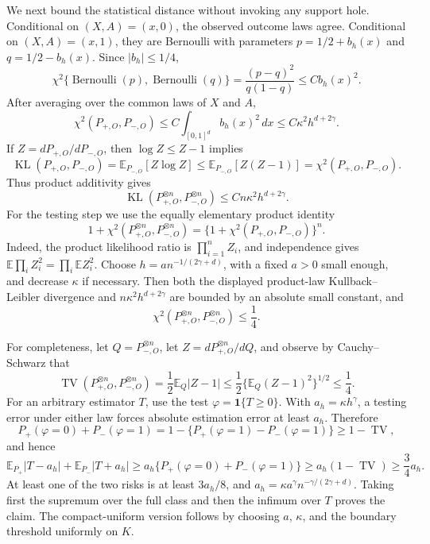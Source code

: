 We next bound the statistical distance without invoking any support hole.  Conditional on \((X,A)=(x,0)\), the observed outcome laws agree.  Conditional on \((X,A)=(x,1)\), they are Bernoulli with parameters \(p=1/2+b_h(x)\) and \(q=1/2-b_h(x)\).  Since \(|b_h|\leq1/4\),
\[
 \chi^2\{\operatorname{Bernoulli}(p),\operatorname{Bernoulli}(q)\}
 =\frac{(p-q)^2}{q(1-q)}\leq Cb_h(x)^2.
\]
After averaging over the common laws of \(X\) and \(A\),
\[
 \chi^2(P_{+,O},P_{-,O})\leq C\int_{[0,1]^d}b_h(x)^2\,dx
 \leq C\kappa^2h^{d+2\gamma}.
\]
If \(Z=dP_{+,O}/dP_{-,O}\), then \(\log Z\leq Z-1\) implies
\[
 \operatorname{KL}(P_{+,O},P_{-,O})
 =\mathbb E_{P_{-,O}}[Z\log Z]
 \leq\mathbb E_{P_{-,O}}[Z(Z-1)]
 =\chi^2(P_{+,O},P_{-,O}).
\]
Thus product additivity gives
\[
 \operatorname{KL}(P_{+,O}^{\otimes n},P_{-,O}^{\otimes n})
 \leq Cn\kappa^2h^{d+2\gamma}.
\]
For the testing step we use the equally elementary product identity
\[
 1+\chi^2(P_{+,O}^{\otimes n},P_{-,O}^{\otimes n})
 =\{1+\chi^2(P_{+,O},P_{-,O})\}^n.
\]
Indeed, the product likelihood ratio is \(\prod_{i=1}^n Z_i\), and independence gives \(\mathbb E\prod_iZ_i^2=\prod_i\mathbb EZ_i^2\).
Choose \(h=a n^{-1/(2\gamma+d)}\), with a fixed \(a>0\) small enough, and decrease \(\kappa\) if necessary.  Then both the displayed product-law Kullback--Leibler divergence and \(n\kappa^2h^{d+2\gamma}\) are bounded by an absolute small constant, and
\[
 \chi^2(P_{+,O}^{\otimes n},P_{-,O}^{\otimes n})\leq\frac14.
\]

For completeness, let \(Q=P_{-,O}^{\otimes n}\), let \(Z=dP_{+,O}^{\otimes n}/dQ\), and observe by Cauchy--Schwarz that
\[
 \operatorname{TV}(P_{+,O}^{\otimes n},P_{-,O}^{\otimes n})
 =\frac12\mathbb E_Q|Z-1|
 \leq\frac12\{\mathbb E_Q(Z-1)^2\}^{1/2}\leq\frac14.
\]
For an arbitrary estimator \(T\), use the test \(\varphi=\mathbf1\{T\geq0\}\).  With \(a_h=\kappa h^\gamma\), a testing error under either law forces absolute estimation error at least \(a_h\).  Therefore
\[
 P_+(\varphi=0)+P_-(\varphi=1)
 =1-\{P_+(\varphi=1)-P_-(\varphi=1)\}\geq1-\operatorname{TV},
\]
and hence
\[
 \mathbb E_{P_+}|T-a_h|+\mathbb E_{P_-}|T+a_h|
 \geq a_h\{P_+(\varphi=0)+P_-(\varphi=1)\}
 \geq a_h(1-\operatorname{TV})\geq\frac34a_h.
\]
At least one of the two risks is at least \(3a_h/8\), and \(a_h=\kappa a^\gamma n^{-\gamma/(2\gamma+d)}\).  Taking first the supremum over the full class and then the infimum over \(T\) proves the claim.  The compact-uniform version follows by choosing \(a\), \(\kappa\), and the boundary threshold uniformly on \(K\).

